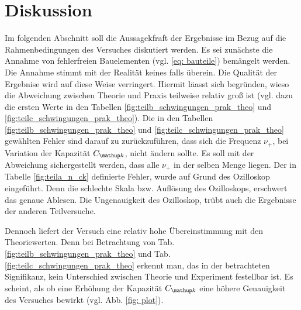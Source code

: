 \section{Diskussion}
Im folgenden Abschnitt soll die Aussagekfraft der Ergebnisse im Bezug auf 
die Rahmenbedingungen des Versuches diskutiert werden.
Es sei zunächste die Annahme von fehlerfreien Bauelementen (vgl. \eqref{eq: bauteile}) 
bemängelt werden. Die Annahme stimmt mit der Realität keines falls überein.
Die Qualität der Ergebnise wird auf diese Weise verringert.
Hiermit läasst sich begründen, wieso die Abweichung zwischen Theorie und Praxis teilweise
relativ groß ist (vgl. dazu die ersten Werte in den Tabellen \ref{fig:teilb_schwingungen_prak_theo} und \ref{fig:teilc_schwingungen_prak_theo}).
Die in den Tabellen \ref{fig:teilb_schwingungen_prak_theo} und \ref{fig:teilc_schwingungen_prak_theo} gewählten Fehler sind darauf zu 
zurückzuführen, dass sich die Frequenz $\nu_+$, bei Variation der Kapazität $C\ua{k}$, nicht ändern sollte.
Es soll mit der Abweichung sichergestellt werden, dass alle $\nu_+$ in der selben Menge liegen.
Der in Tabelle \ref{fig:teila_n_ck} definierte Fehler, wurde auf Grund des  Ozilloskop eingeführt.
Denn die schlechte Skala bzw. Auflösung des Ozilloskops, erschwert das genaue Ablesen. 
Die Ungenauigkeit des Ozilloskop, trübt auch die Ergebnisse der anderen Teilversuche.

Dennoch liefert der Versuch eine relativ hohe Übereinstimmung mit den Theoriewerten.
Denn bei Betrachtung von Tab. \ref{fig:teilb_schwingungen_prak_theo} und Tab. \ref{fig:teilc_schwingungen_prak_theo} erkennt man, 
das in der betrachteten Signifikanz, kein Unterschied zwischen 
Theorie und Experiment festellbar ist. 
Es scheint, als ob eine Erhöhung der Kapazität $C\ua{k}$ eine höhere Genauigkeit des Versuches bewirkt (vgl. Abb. \ref{fig: plot}).


